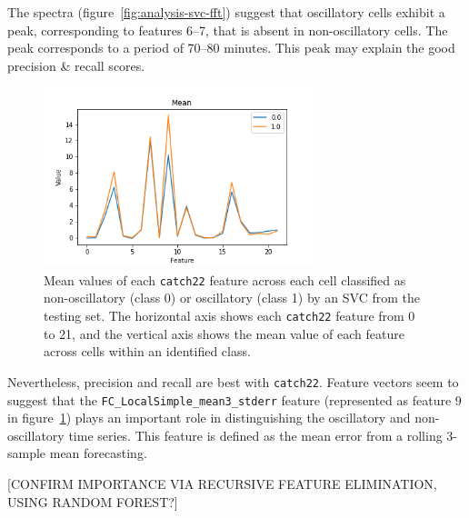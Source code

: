 The spectra (figure~\ref{fig:analysis-svc-fft}) suggest that oscillatory cells exhibit a peak, corresponding to features 6--7, that is absent in non-oscillatory cells.
The peak corresponds to a period of 70--80 minutes.
This peak may explain the good precision \& recall scores.

\begin{figure}
  \centering
  \includegraphics[width=0.7\textwidth]{catch22_training_featurevector_mean}
  \caption{
    Mean values of each \texttt{catch22} feature across each cell classified as non-oscillatory (class 0) or oscillatory (class 1) by an SVC from the testing set.
    The horizontal axis shows each \texttt{catch22} feature from 0 to 21, and the vertical axis shows the mean value of each feature across cells within an identified class.
  }
  \label{fig:analysis-svc-catch22}
\end{figure}

Nevertheless, precision and recall are best with \texttt{catch22}.
Feature vectors seem to suggest that the \texttt{FC\_LocalSimple\_mean3\_stderr} feature (represented as feature 9 in figure~\ref{fig:analysis-svc-catch22}) plays an important role in distinguishing the oscillatory and non-oscillatory time series.
This feature is defined as the mean error from a rolling 3-sample mean forecasting.

[CONFIRM IMPORTANCE VIA RECURSIVE FEATURE ELIMINATION, USING RANDOM FOREST?]


